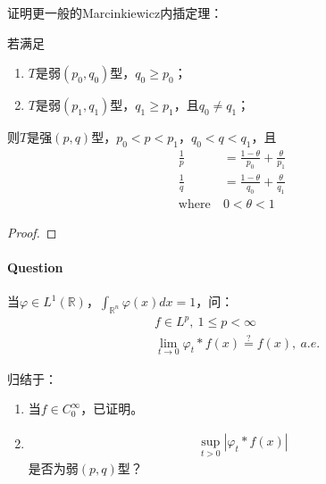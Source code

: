 \begin{exercise}
    证明更一般的Marcinkiewicz内插定理：
    \begin{theorem}
        若满足
        \begin{enumerate}[leftmargin=1cm, label=\arabic*.]
        \item $T$是弱$(p_0,q_0)$型，$q_0 \geqslant p_0$；
        \item $T$是弱$(p_1, q_1)$型，$q_1\geqslant p_1$，且$q_0\neq q_1$；
    \end{enumerate}
    则$T$是强$(p,q)$型，$p_0<p<p_1$，$q_0<q<q_1$，且
    \begin{align*}
        \frac{1}{p} &= \frac{1-\theta}{p_0} + \frac{\theta}{p_1} \\
        \frac{1}{q} &= \frac{1-\theta}{q_0} + \frac{\theta}{q_1} \\
        \text{where}\ & 0<\theta < 1
    \end{align*}
    \end{theorem}
\end{exercise}
\begin{proof}
    
\end{proof}












\paragraph{Question} 当$\varphi\in L^1(\mathbb{R})$，$\int_{\mathbb{R}^n} \varphi(x) dx = 1$，问：
\begin{align*}
    &f\in L^p ,\ 1\leqslant p<\infty \\
    & \lim\limits_{t\to 0} \varphi_t * f(x) \overset{?}{=} f(x),\ a.e.
\end{align*}

归结于：
\begin{enumerate}[leftmargin=1cm, label=\arabic*.]
    \item 当$f\in C_0^{\infty}$，已证明。
    \item 
    \begin{align*}
        \sup\limits_{t>0} |\varphi_t * f(x)|
    \end{align*}
    是否为弱$(p,q)$型？
\end{enumerate}






